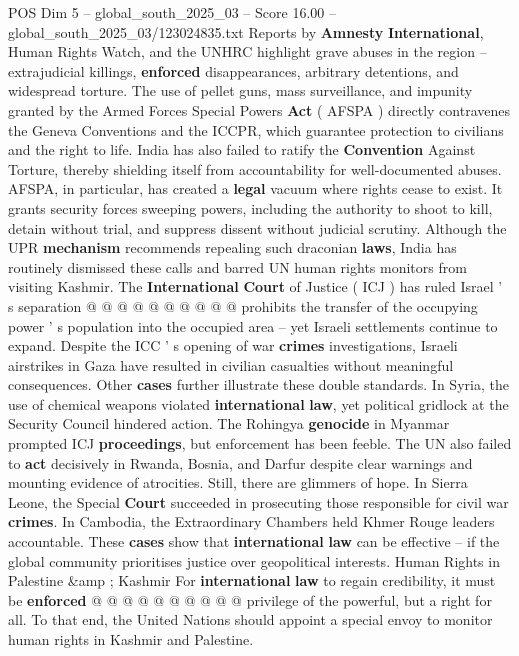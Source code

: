 \begin{textsample}{POS Dim 5 – global\_south\_2025\_03 – Score 16.00 – global\_south\_2025\_03/123024835.txt}
Reports by \textbf{Amnesty} \textbf{International}, Human Rights Watch, and the UNHRC highlight grave abuses in the region -- extrajudicial killings, \textbf{enforced} disappearances, arbitrary detentions, and widespread torture.
The use of pellet guns, mass surveillance, and impunity granted by the Armed Forces Special Powers \textbf{Act} ( AFSPA ) directly contravenes the Geneva Conventions and the ICCPR, which guarantee protection to civilians and the right to life.
India has also failed to ratify the \textbf{Convention} Against Torture, thereby shielding itself from accountability for well-documented abuses.
AFSPA, in particular, has created a \textbf{legal} vacuum where rights cease to exist.
It grants security forces sweeping powers, including the authority to shoot to kill, detain without trial, and suppress dissent without judicial scrutiny.
Although the UPR \textbf{mechanism} recommends repealing such draconian \textbf{laws}, India has routinely dismissed these calls and barred UN human rights monitors from visiting Kashmir.
The \textbf{International} \textbf{Court} of Justice ( ICJ ) has ruled Israel ' s separation @ @ @ @ @ @ @ @ @ @ prohibits the transfer of the occupying power ' s population into the occupied area -- yet Israeli settlements continue to expand.
Despite the ICC ' s opening of war \textbf{crimes} investigations, Israeli airstrikes in Gaza have resulted in civilian casualties without meaningful consequences.
Other \textbf{cases} further illustrate these double standards.
In Syria, the use of chemical weapons violated \textbf{international} \textbf{law}, yet political gridlock at the Security Council hindered action.
The Rohingya \textbf{genocide} in Myanmar prompted ICJ \textbf{proceedings}, but enforcement has been feeble.
The UN also failed to \textbf{act} decisively in Rwanda, Bosnia, and Darfur despite clear warnings and mounting evidence of atrocities.
Still, there are glimmers of hope.
In Sierra Leone, the Special \textbf{Court} succeeded in prosecuting those responsible for civil war \textbf{crimes}.
In Cambodia, the Extraordinary Chambers held Khmer Rouge leaders accountable.
These \textbf{cases} show that \textbf{international} \textbf{law} can be effective -- if the global community prioritises justice over geopolitical interests.
Human Rights in Palestine \&amp ; Kashmir For \textbf{international} \textbf{law} to regain credibility, it must be \textbf{enforced} @ @ @ @ @ @ @ @ @ @ privilege of the powerful, but a right for all.
To that end, the United Nations should appoint a special envoy to monitor human rights in Kashmir and Palestine.

\end{textsample}
